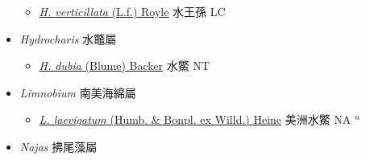 \begin{itemize}
  \begin{itemize}
        \item[] \href{http://www.theplantlist.org/tpl1.1/search?q=Hydrilla+verticillata}{\textit{H. verticillata} (L.f.) Royle}   水王孫 LC
  \end{itemize}
 \item[] \textit{Hydrocharis} 水鼈屬
                    
  \begin{itemize}
        \item[] \href{http://www.theplantlist.org/tpl1.1/search?q=Hydrocharis+dubia}{\textit{H. dubia} (Blume) Backer}   水鱉 NT
  \end{itemize}
 \item[] \textit{Limnobium} 南美海綿屬
                    
  \begin{itemize}
        \item[] \href{http://www.theplantlist.org/tpl1.1/search?q=Limnobium+laevigatum}{\textit{L. laevigatum} (Humb. \& Bonpl. ex Willd.) Heine}   美洲水鱉 NA $^n$
  \end{itemize}
 \item[] \textit{Najas} 拂尾藻屬
                    

\end{itemize}
